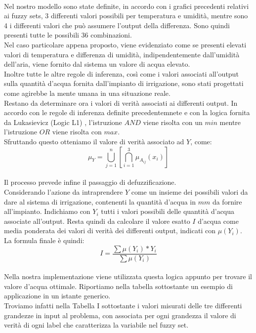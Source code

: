 \documentclass[conference,10pt]{IEEEtran}
\begin{document}
\\Nel nostro modello sono state definite, in accordo con i grafici precedenti relativi ai fuzzy sets, 3 differenti valori possibili per temperatura e umidità, mentre sono 4 i differenti valori che può assumere l'output della differenza. Sono quindi presenti tutte le possibili 36 combinazioni. \\
Nel caso particolare appena proposto, viene evidenziato come se presenti elevati valori di temperatura e differenza di umidità, indipendentemente dall'umidità dell'aria, viene fornito dal sistema un valore di acqua elevato.
\\Inoltre tutte le altre regole di inferenza, così come i valori associati all'output sulla quantità d'acqua fornita dall'impianto di irrigazione, sono stati progettati come agirebbe la mente umana in una situazione reale.\\
Restano da determinare ora i valori di verità associati ai differenti output. In accordo con le regole di inferenza definite precedentemnete e con la logica fornita da Lukasievicz (Logic L1) \cite{10}, l'istruzione $AND$ viene risolta con un $min$ mentre l'istruzione $OR$ viene risolta con $max$.\\
Sfruttando questo otteniamo il valore di verità associato ad $Y$, come:\\
\begin{equation*}
\mu_Y= \bigcup\limits_{j=1}^{n} \left[ \bigcap\limits_{i=1}^{3} \mu_{A_{ij}}\left(x_i \right)  \right] 
\end{equation*}
\\Il processo prevede infine il passaggio di defuzzificazione.\\
Considerando l'azione da intraprendere $Y$ come un insieme dei possibili valori da dare al sistema di irrigazione, contenenti la quantità d'acqua in $mm$ da fornire all'impianto.
Indichiamo con $Y_i$ tutti i valori possibili delle quantità d'acqua associate all'output. Resta quindi da calcolare il valore esatto $I$ d'acqua come media ponderata dei valori di verità dei differenti output, indicati con $\mu(Y_i)$.\\
La formula finale è quindi:\\
\begin{equation*}
I=\dfrac{\sum \mu(Y_i)*Y_i}{\sum \mu (Y_i)}
\end{equation*} 
\\Nella nostra implementazione viene utilizzata questa logica appunto per trovare il valore d'acqua ottimale. Riportiamo nella tabella sottostante un esempio di applicazione in un istante generico.\\ Troviamo infatti nella Tabella I sottostante i valori misurati delle tre differenti grandezze in input al problema, con associata per ogni grandezza il valore di verità di ogni label che caratterizza la variabile nel fuzzy set.
\end{document}
